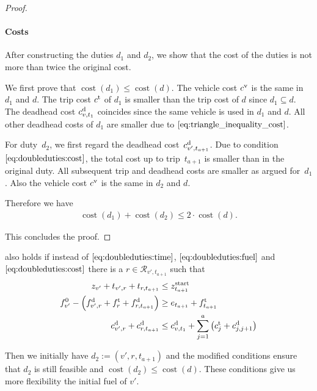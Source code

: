 \begin{proof}
\paragraph{Costs} \proofparfill

After constructing the duties $d_1$ and $d_2$, we show that the cost of the duties is not more than twice the original cost.

We first prove that ${\operatorname{cost}\left(d_1\right)\leq\operatorname{cost}\left(d\right)}$. The vehicle cost $c^{\operatorname{v}}$ is the same in $d_1$ and $d$. The trip cost $c^{\operatorname{t}}$ of $d_1$ is smaller than the trip cost of $d$ since ${d_1\subseteq d}$. The deadhead cost $c^{\operatorname{d}}_{v,t_1}$ coincides since the same vehicle is used in $d_1$ and $d$. All other deadhead costs of $d_1$ are smaller due to $\eqref{eq:triangle_inequality_cost}$.

For duty~$d_2$, we first regard the deadhead cost~$c^{\operatorname{d}}_{v',t_{a+1}}$. Due to condition~$\eqref{eq:doubleduties:cost}$, the total cost up to trip~$t_{a+1}$ is smaller than in the original duty. All subsequent trip and deadhead costs are smaller as argued for~$d_1$. Also the vehicle cost $c^{\operatorname{v}}$ is the same in $d_2$ and $d$.

Therefore we have
\begin{align*}
	\operatorname{cost}\left(d_1\right)+\operatorname{cost}\left(d_2\right)\leq 2\cdot\operatorname{cost}\left(d\right).
\end{align*}

This concludes the proof.

\end{proof}

\begin{remark}
\label{rem:doubleduties}

 also holds if instead of $\eqref{eq:doubleduties:time}$, $\eqref{eq:doubleduties:fuel}$ and $\eqref{eq:doubleduties:cost}$ there is a ${r\in\mathcal{R}_{v',t_{a+1}}}$ such that
\begin{align}
	z_{v'} + t_{v',r} + t_{r,t_{a+1}} & \leq z^{\operatorname{start}}_{t_{a+1}} \label{eq:doubleduties:time_r} \\
	f^0_{v'} - \left(f^{\operatorname{d}}_{v',r}+f^{\operatorname{t}}_r+f^{\operatorname{d}}_{r,t_{a+1}}\right) & \geq e_{t_{a+1}} + f^{\operatorname{t}}_{t_{a+1}} \label{eq:doubleduties:fuel_r} \\
	c^{\operatorname{d}}_{v',r}+c^{\operatorname{d}}_{r,t_{a+1}} & \leq c^{\operatorname{d}}_{v,t_1} + \sum_{j=1}^a \left(c^{\operatorname{t}}_j + c^{\operatorname{d}}_{j,j+1}\right) \label{eq:doubleduties:cost_r}
\end{align}

Then we initially have $d_2:=\left(v',r,t_{a+1}\right)$ and the modified conditions ensure that $d_2$ is still feasible and ${\operatorname{cost}\left(d_2\right)\leq\operatorname{cost}\left(d\right)}$. These conditions give us more flexibility \wrt the initial fuel of $v'$.

\end{remark}

